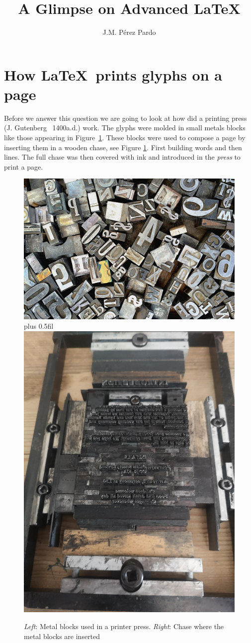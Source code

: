 \documentclass[a4paper]{article}
\title{A Glimpse on Advanced \LaTeX{}}
\author{J.M. Pérez Pardo}
\date{}
\begin{document}
\maketitle

\tableofcontents

\section{How \LaTeX\ prints glyphs on a page}

Before we answer this question we are going to look at how did a printing press (J. Gutenberg ~1400a.d.) work. The glyphs were molded in small metals blocks like those appearing in Figure~\ref{fig:metalblockschase}. These blocks were used to compose a page by inserting them in a wooden chase, see Figure \ref{fig:metalblockschase}. First building words and then lines. The full chase was then covered with ink and introduced in the \emph{press} to print a page.
%
\begin{figure}[h]
  \hfil\vbox{ \hbox{\includegraphics[width=.5\textwidth]{glympse_figures/metal_blocks.jpg}} \vspace{1cm}}\hskip 0pt plus 0.5fil \includegraphics[width=.4\textwidth]{glympse_figures/chase.jpg}\hfil
  \caption{\emph{Left}: Metal blocks used in a printer press. \emph{Right}: Chase where the metal blocks are inserted}\label{fig:metalblockschase}
\end{figure}
%
\end{document}
